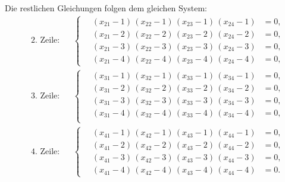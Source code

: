 Die restlichen Gleichungen folgen dem gleichen System:
\begin{align}
&\text{2.~Zeile:}
&&
\left\{\quad
  \begin{aligned}
  (x_{21} - 1)\,(x_{22} - 1)\,(x_{23} - 1)\,(x_{24} - 1) &= 0,\\
  (x_{21} - 2)\,(x_{22} - 2)\,(x_{23} - 2)\,(x_{24} - 2) &= 0,\\
  (x_{21} - 3)\,(x_{22} - 3)\,(x_{23} - 3)\,(x_{24} - 3) &= 0,\\
  (x_{21} - 4)\,(x_{22} - 4)\,(x_{23} - 4)\,(x_{24} - 4) &= 0,
  \end{aligned}
\right.
\\
&\text{3.~Zeile:}
&&
\left\{\quad
\begin{aligned}
  (x_{31} - 1)\,(x_{32} - 1)\,(x_{33} - 1)\,(x_{34} - 1) &= 0,\\
  (x_{31} - 2)\,(x_{32} - 2)\,(x_{33} - 2)\,(x_{34} - 2) &= 0,\\
  (x_{31} - 3)\,(x_{32} - 3)\,(x_{33} - 3)\,(x_{34} - 3) &= 0,\\
  (x_{31} - 4)\,(x_{32} - 4)\,(x_{33} - 4)\,(x_{34} - 4) &= 0,\\
\end{aligned}
\right.
\\
&\text{4.~Zeile:}
&&
\left\{\quad
\begin{aligned}
  (x_{41} - 1)\,(x_{42} - 1)\,(x_{43} - 1)\,(x_{44} - 1) &= 0,\\
  (x_{41} - 2)\,(x_{42} - 2)\,(x_{43} - 2)\,(x_{44} - 2) &= 0,\\
  (x_{41} - 3)\,(x_{42} - 3)\,(x_{43} - 3)\,(x_{44} - 3) &= 0,\\
  (x_{41} - 4)\,(x_{42} - 4)\,(x_{43} - 4)\,(x_{44} - 4) &= 0.
  \end{aligned}
\right.
\label{buchberger:sudoku-gleichung-6}
\end{align}

